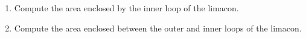 \documentclass[12pt]{article}
\newif\ifans
\begin{document}
\begin{enumerate}
\begin{enumerate}

\item Compute the area enclosed by the inner loop of the limacon.

\ifans{\fbox{$-\frac{9\sqrt{3}}{2}+3\pi$; Detailed Solution: \textcolor{blue}{\href{http://www.math.drexel.edu/classes/Calculus/resources/Math122HW/Solutions/122_19_Polar_Calc_18.pdf}{Here}}}} \fi

\item Compute the area enclosed between the outer and inner loops of the limacon.

\ifans{\fbox{$9\sqrt{3}+3\pi$; Detailed Solution: \textcolor{blue}{\href{http://www.math.drexel.edu/classes/Calculus/resources/Math122HW/Solutions/122_19_Polar_Calc_18.pdf}{Here}}}} \fi

\end{enumerate}

\end{enumerate}
\end{document}
